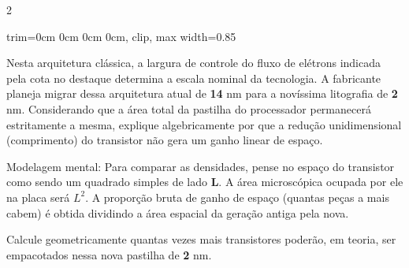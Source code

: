 \documentclass[twoside, 10pt, a4paper]{article}
\newlength{\espacoQuestao}\setlength{\espacoQuestao}{0.2cm}
\newcommand{\larguraTikz}{0.85\linewidth}
\begin{document}
\begin{multicols*}{2}
\begin{center}
\begin{adjustbox}{trim=0cm 0cm 0cm 0cm, clip, max width=\larguraTikz}
\end{adjustbox}
\end{center}
Nesta arquitetura clássica, a largura de controle do fluxo de elétrons indicada pela cota no destaque determina a escala nominal da tecnologia. A fabricante planeja migrar dessa arquitetura atual de \textbf{14} nm para a novíssima litografia de \textbf{2} nm. Considerando que a área total da pastilha do processador permanecerá estritamente a mesma, explique algebricamente por que a redução unidimensional (comprimento) do transistor não gera um ganho linear de espaço. 
\begin{boxdica}
Modelagem mental: Para comparar as densidades, pense no espaço do transistor como sendo um quadrado simples de lado \textbf{L}. A área microscópica ocupada por ele na placa será $L^2$. A proporção bruta de ganho de espaço (quantas peças a mais cabem) é obtida dividindo a área espacial da geração antiga pela nova.
\end{boxdica}
Calcule geometricamente quantas vezes mais transistores poderão, em teoria, ser empacotados nessa nova pastilha de \textbf{2} nm.
\par\vspace{\espacoQuestao}

\end{multicols*}
\end{document}
